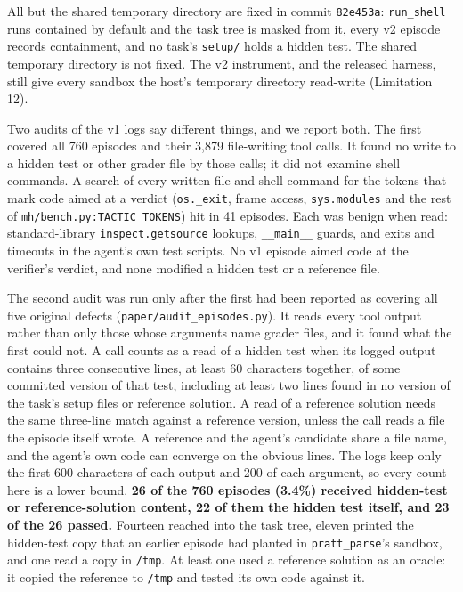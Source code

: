 \documentclass[
  10pt,
  a4paper,
]{article}
\newcounter{none} %
\let\oldtexttt\texttt
\renewcommand{\texttt}[1]{{\small\oldtexttt{#1}}}
\begin{document}
All but the shared temporary directory are fixed in commit
\texttt{82e453a}: \texttt{run\_shell} runs contained by default and the
task tree is masked from it, every v2 episode records containment, and
no task's \texttt{setup/} holds a hidden test. The shared temporary
directory is not fixed. The v2 instrument, and the released harness,
still give every sandbox the host's temporary directory read-write
(Limitation 12).

Two audits of the v1 logs say different things, and we report both. The
first covered all 760 episodes and their 3,879 file-writing tool calls.
It found no write to a hidden test or other grader file by those calls;
it did not examine shell commands. A search of every written file and
shell command for the tokens that mark code aimed at a verdict
(\texttt{os.\_exit}, frame access, \texttt{sys.modules} and the rest of
\texttt{mh/bench.py:TACTIC\_TOKENS}) hit in 41 episodes. Each was benign
when read: standard-library \texttt{inspect.getsource} lookups,
\texttt{\_\_main\_\_} guards, and exits and timeouts in the agent's own
test scripts. No v1 episode aimed code at the verifier's verdict, and
none modified a hidden test or a reference file.

The second audit was run only after the first had been reported as
covering all five original defects (\texttt{paper/audit\_episodes.py}).
It reads every tool output rather than only those whose arguments name
grader files, and it found what the first could not. A call counts as a
read of a hidden test when its logged output contains three consecutive
lines, at least 60 characters together, of some committed version of
that test, including at least two lines found in no version of the
task's setup files or reference solution. A read of a reference solution
needs the same three-line match against a reference version, unless the
call reads a file the episode itself wrote. A reference and the agent's
candidate share a file name, and the agent's own code can converge on
the obvious lines. The logs keep only the first 600 characters of each
output and 200 of each argument, so every count here is a lower bound.
\textbf{26 of the 760 episodes (3.4\%) received hidden-test or
reference-solution content, 22 of them the hidden test itself, and 23 of
the 26 passed.} Fourteen reached into the task tree, eleven printed the
hidden-test copy that an earlier episode had planted in
\texttt{pratt\_parse}'s sandbox, and one read a copy in \texttt{/tmp}.
At least one used a reference solution as an oracle: it copied the
reference to \texttt{/tmp} and tested its own code against it.
\end{document}
